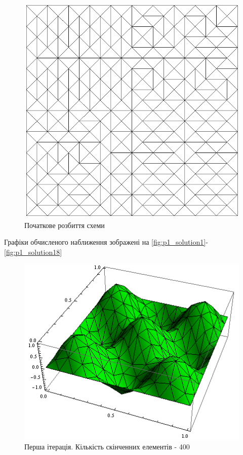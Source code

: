 \begin{figure}[H]
	\centering
    \includegraphics[scale=0.7]{problem1/InitialMesh}
    \caption{Початкове розбиття схеми}
    \label{fig:init_mesh1}
\end{figure}


Графіки обчисленого наближення зображені на \autoref{fig:p1_solution1}-\ref{fig:p1_solution18}


\begin{figure}[H]
	\centering
    \includegraphics[scale=0.9]{problem1/MY/solutions/1}
    \caption{Перша ітерація. Кількість скінченних елементів - 400}
    \label{fig:p1_solution1}
\end{figure}


